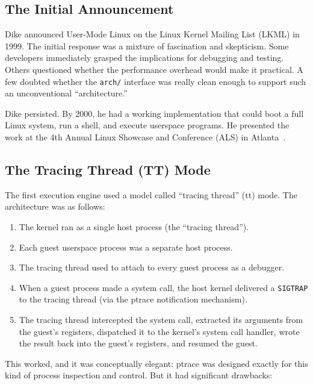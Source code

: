 \subsection{The Initial Announcement}
\label{sec:history-announcement}

Dike announced User-Mode Linux on the Linux Kernel Mailing List (LKML) in
1999.  The initial response was a mixture of fascination and skepticism.  Some
developers immediately grasped the implications for debugging and testing.
Others questioned whether the performance overhead would make it practical.
A few doubted whether the \texttt{arch/} interface was really clean enough to
support such an unconventional ``architecture.''

Dike persisted.  By 2000, he had a working implementation that could boot a
full Linux system, run a shell, and execute userspace programs.  He presented
the work at the 4th Annual Linux Showcase and Conference (ALS) in
Atlanta~\cite{dike2000}.

\subsection{The Tracing Thread (TT) Mode}
\label{sec:history-tt}

The first \UML{} execution engine used a model called ``tracing thread'' (tt)
mode.  The architecture was as follows:

\begin{enumerate}[nosep]
  \item The \UML{} kernel ran as a single host process (the ``tracing thread'').
  \item Each guest userspace process was a separate host process.
  \item The tracing thread used  to attach to every guest
    process as a debugger.
  \item When a guest process made a system call, the host kernel delivered a
    \texttt{SIGTRAP} to the tracing thread (via the ptrace notification
    mechanism).
  \item The tracing thread intercepted the system call, extracted its arguments
    from the guest's registers, dispatched it to the \UML{} kernel's system call
    handler, wrote the result back into the guest's registers, and resumed the
    guest.
\end{enumerate}

\noindent
This worked, and it was conceptually elegant: ptrace was designed exactly for
this kind of process inspection and control.  But it had significant drawbacks:


